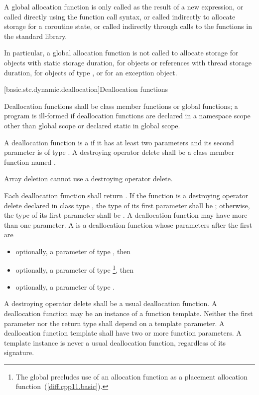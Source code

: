 \pnum
A global allocation function is only called as the result of a new
expression, or called directly using the function call
syntax, or called indirectly to allocate storage for
a coroutine state,
or called indirectly through calls to the
functions in the \Cpp{} standard library.
\begin{note}
In particular, a
global allocation function is not called to allocate storage for objects
with static storage duration, for objects or references
with thread storage duration, for objects of
type , or for an
exception object.
\end{note}

[basic.stc.dynamic.deallocation]{Deallocation functions}

\pnum
{}%
Deallocation functions shall be class member functions or global
functions; a program is ill-formed if deallocation functions are
declared in a namespace scope other than global scope or declared static
in global scope.

\pnum
A deallocation function
is a 
if it has at least two parameters
and its second parameter
is of type .
A destroying operator delete
shall be a class member function named .
\begin{note}
Array deletion cannot use a destroying operator delete.
\end{note}

\pnum
{}%
Each deallocation function shall return .
If the function is a destroying operator delete
declared in class type ,
the type of its first parameter shall be ;
otherwise, the type of its first
parameter shall be . A deallocation function may have more
than one parameter.
%
A  is a deallocation function
whose parameters after the first are
\begin{itemize}
\item
optionally, a parameter of type , then
\item
optionally, a parameter of type %
\footnote{The global 
precludes use of an
allocation function  as a placement
allocation function~(\ref{diff.cpp11.basic}).}, then
\item
optionally, a parameter of type .
\end{itemize}
A destroying operator delete shall be a usual deallocation function.
A deallocation function may be an instance of a function
template. Neither the first parameter nor the return type shall depend
on a template parameter.
A deallocation
function template shall have two or more function parameters. A template
instance is never a usual deallocation function, regardless of its
signature.

